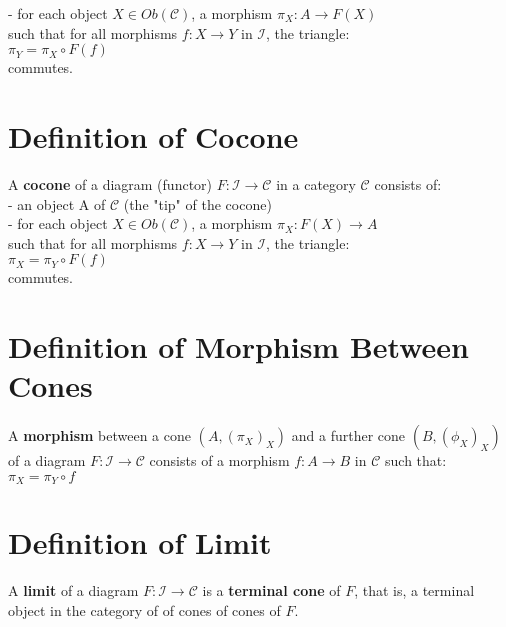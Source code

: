 \documentclass[a4paper, twoside, english, 11pt]{book}
\newcommand{\C}{\mathcal C}
\newcommand{\I}{\mathcal I}
\begin{document}
- for each object $X \in Ob(\C)$, a morphism $\pi_X : A \rightarrow F(X)$ \\

\noindent
such that for all morphisms $f: X \rightarrow Y$ in $\I$, the triangle: \\

$\pi_Y = \pi_X \circ F(f)$ \\

\noindent
commutes.



\section{Definition of Cocone}

A \textbf{cocone} of a diagram (functor) $F : \I \rightarrow \C$ in a category $\C$ consists of: \\

- an object A of $\C$ (the "tip" of the cocone) \\

- for each object $X \in Ob(\C)$, a morphism $\pi_X : F(X) \rightarrow A$ \\

\noindent
such that for all morphisms $f: X \rightarrow Y$ in $\I$, the triangle: \\

$\pi_X = \pi_Y \circ F(f)$ \\

\noindent
commutes.



\section{Definition of Morphism Between Cones}

A \textbf{morphism} between a cone $(A, (\pi_X)_X)$ and a further cone $(B, (\phi_X)_X)$ of a diagram $F : \I \rightarrow \C$ consists of a morphism $f : A \rightarrow B$ in $\C$ such that: \\

$\pi_X = \pi_Y \circ f$



\section{Definition of Limit}

A \textbf{limit} of a diagram $F : \I \rightarrow \C$ is a \textbf{terminal cone} of $F$, that is, a terminal object in the category of of cones of cones of $F$.
\end{document}

